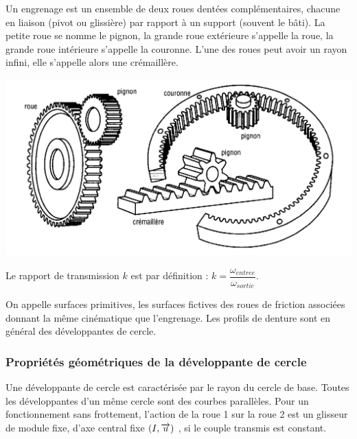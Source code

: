 \documentclass[11pt,oneside]{article}
\begin{document}
\begin{minipage}[c]{.5\linewidth}
Un engrenage est un ensemble de deux roues dentées complémentaires, chacune en liaison (pivot ou glissière) par rapport à un support (souvent le bâti).
La petite roue se nomme le pignon, la grande roue extérieure s’appelle la roue, la grande roue intérieure s’appelle la couronne. L’une des roues peut avoir un rayon infini, elle s’appelle alors une crémaillère.

\end{minipage} \hfill
\begin{minipage}[c]{.45\linewidth}
\begin{center}
\includegraphics[width=.8\textwidth]{png/fig_57}
\end{center}
\end{minipage} 

Le rapport de transmission $k$ est par définition :  $k = \dfrac{\omega_{entree}}{\omega_{sortie}}$.

On appelle surfaces primitives, les surfaces fictives des roues de friction associées donnant la même cinématique que l’engrenage. Les profils de denture sont en général des développantes de cercle.

\subsubsection{Propriétés géométriques de la développante de cercle}

Une développante de cercle est caractérisée par le rayon du cercle de base. Toutes les développantes d’un même cercle sont des courbes parallèles. Pour un fonctionnement sans frottement, l’action de la roue 1 sur la roue 2 est un glisseur de module fixe, d’axe central fixe $(I,\overrightarrow{u})$ , si le couple transmis est constant. 
\end{document}
